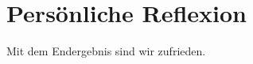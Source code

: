 \section{Persönliche Reflexion}
\label{sec:Robin:reflexion}

Mit dem Endergebnis sind wir zufrieden.